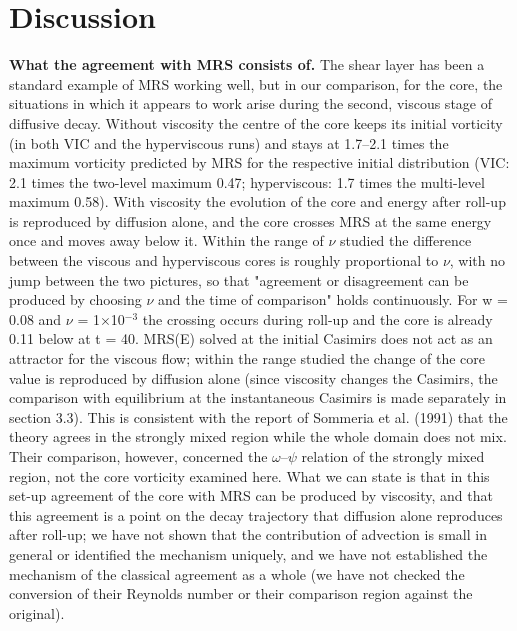 \documentclass[11pt]{article}
\begin{document}
\section{Discussion}

\textbf{What the agreement with MRS consists of.} The shear layer has been a standard example of MRS working well, but in our comparison, for the core, the situations in which it appears to work arise during the second, viscous stage of diffusive decay. Without viscosity the centre of the core keeps its initial vorticity (in both VIC and the hyperviscous runs) and stays at 1.7--2.1 times the maximum vorticity predicted by MRS for the respective initial distribution (VIC: 2.1 times the two-level maximum 0.47; hyperviscous: 1.7 times the multi-level maximum 0.58). With viscosity the evolution of the core and energy after roll-up is reproduced by diffusion alone, and the core crosses MRS at the same energy once and moves away below it. Within the range of $\nu{}$ studied the difference between the viscous and hyperviscous cores is roughly proportional to $\nu{}$, with no jump between the two pictures, so that "agreement or disagreement can be produced by choosing $\nu{}$ and the time of comparison" holds continuously. For w = 0.08 and $\nu{}$ = 1$\times{}$10$^{-3}$ the crossing occurs during roll-up and the core is already 0.11 below at t = 40. MRS(E) solved at the initial Casimirs does not act as an attractor for the viscous flow; within the range studied the change of the core value is reproduced by diffusion alone (since viscosity changes the Casimirs, the comparison with equilibrium at the instantaneous Casimirs is made separately in section 3.3). This is consistent with the report of Sommeria et al. (1991) that the theory agrees in the strongly mixed region while the whole domain does not mix. Their comparison, however, concerned the $\omega{}$--$\psi{}$ relation of the strongly mixed region, not the core vorticity examined here. What we can state is that in this set-up agreement of the core with MRS can be produced by viscosity, and that this agreement is a point on the decay trajectory that diffusion alone reproduces after roll-up; we have not shown that the contribution of advection is small in general or identified the mechanism uniquely, and we have not established the mechanism of the classical agreement as a whole (we have not checked the conversion of their Reynolds number or their comparison region against the original).
\end{document}
